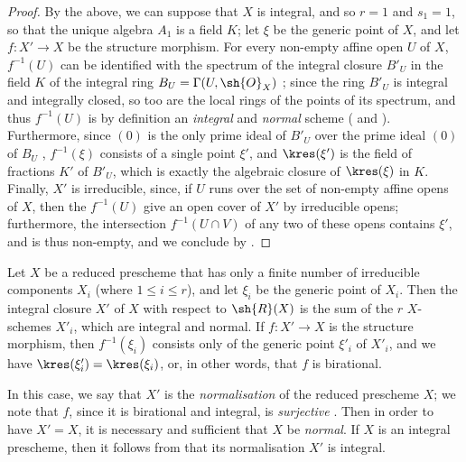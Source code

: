 \begin{proof}
By the above, we can suppose that $X$ is integral, and so $r=1$ and $s_1=1$, so that the unique algebra $A_1$ is a field $K$;
let $\xi$ be the generic point of $X$, and let $f:X'\to X$ be the structure morphism.
For every non-empty affine open $U$ of $X$, $f^{-1}(U)$ can be identified with the spectrum of the integral closure $B'_U$ in the field $K$ of the integral ring $B_U=\Gamma(U,\sh{O}_X)$ ;
since the ring $B'_U$ is integral and integrally closed, so too are the local rings of the points of its spectrum, and thus $f^{-1}(U)$ is by definition an \emph{integral} and \emph{normal} scheme ( and ).
Furthermore, since $(0)$ is the only prime ideal of $B'_U$ over the prime ideal $(0)$ of $B_U$ \cite[t.~I, p.~259]{I-13}, $f^{-1}(\xi)$ consists of a single point $\xi'$, and $\kres(\xi')$ is the field of fractions $K'$ of $B'_U$, which is exactly the algebraic closure of $\kres(\xi)$ in $K$.
Finally, $X'$ is irreducible, since, if $U$ runs over the set of non-empty affine opens of $X$, then the $f^{-1}(U)$ give an open cover of $X'$ by irreducible opens;
furthermore, the intersection $f^{-1}(U\cap V)$ of any two of these opens contains $\xi'$, and is thus non-empty, and we conclude by .
\end{proof}

\begin{corollary}[6.3.8]
\label{II.6.3.8}
Let $X$ be a reduced prescheme that has only a finite number of irreducible components $X_i$ (where $1\leq i\leq r$), and let $\xi_i$ be the generic point of $X_i$.
Then the integral closure $X'$ of $X$ with respect to $\sh{R}(X)$ is the sum of the $r$ $X$-schemes $X'_i$, which are integral and normal.
If $f:X'\to X$ is the structure morphism, then $f^{-1}(\xi_i)$ consists only of the generic point $\xi'_i$ of $X'_i$, and we have $\kres(\xi'_i)=\kres(\xi_i)$, or, in other words, that $f$ is birational.
\end{corollary}

In this case, we say that $X'$ is the \emph{normalisation} of the reduced prescheme $X$;
we note that $f$, since it is birational and integral, is \emph{surjective} .
Then in order to have $X'=X$, it is necessary and sufficient that $X$ be \emph{normal}.
If $X$ is an integral prescheme, then it follows from  that its normalisation $X'$ is integral.

